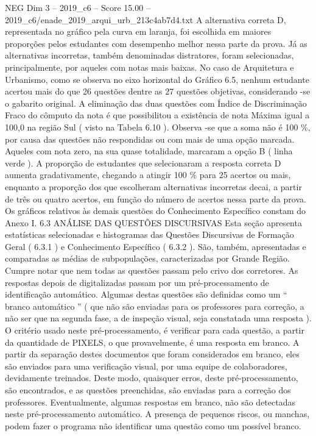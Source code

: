 \begin{textsample}{NEG Dim 3 – 2019\_c6 – Score 15.00 – 2019\_c6/enade\_2019\_arqui\_urb\_213c4ab7d4.txt}
A alternativa correta D, representada no gráfico pela curva em laranja, foi escolhida em maiores proporções pelos estudantes com desempenho melhor nessa parte da prova.
Já as alternativas incorretas, também denominadas distratores, foram selecionadas, principalmente, por aqueles com notas mais baixas.
No caso de Arquitetura e Urbanismo, como se observa no eixo horizontal do Gráfico 6.5, nenhum estudante acertou mais do que 26 questões dentre as 27 questões objetivas, considerando -se o gabarito original.
A eliminação das duas questões com Índice de Discriminação Fraco do cômputo da nota é que possibilitou a existência de nota Máxima igual a 100,0 na região Sul ( visto na Tabela 6.10 ).
Observa -se que a soma não é 100 \%, por causa das questões não respondidas ou com mais de uma opção marcada.
Aqueles com nota zero, na sua quase totalidade, marcaram a opção B ( linha verde ).
A proporção de estudantes que selecionaram a resposta correta D aumenta gradativamente, chegando a atingir 100 \% para 25 acertos ou mais, enquanto a proporção dos que escolheram alternativas incorretas decai, a partir de três ou quatro acertos, em função do número de acertos nessa parte da prova.
Os gráficos relativos às demais questões do Conhecimento Específico constam do Anexo I. 6.3 ANÁLISE DAS QUESTÕES DISCURSIVAS Esta seção apresenta estatísticas selecionadas e histogramas das Questões Discursivas de Formação Geral ( 6.3.1 ) e Conhecimento Específico ( 6.3.2 ).
São, também, apresentadas e comparadas as médias de subpopulações, caracterizadas por Grande Região.
Cumpre notar que nem todas as questões passam pelo crivo dos corretores.
As respostas depois de digitalizadas passam por um pré-processamento de identificação automático.
Algumas destas questões são definidas como um “ branco automático ” ( que não são enviadas para os professores para correção, a não ser que na segunda fase, a de inspeção visual, seja constatada uma resposta ).
O critério usado neste pré-processamento, é verificar para cada questão, a partir da quantidade de PIXELS, o que provavelmente, é uma resposta em branco.
A partir da separação destes documentos que foram considerados em branco, eles são enviados para uma verificação visual, por uma equipe de colaboradores, devidamente treinados.
Deste modo, quaisquer erros, deste pré-processamento, são encontrados, e as questões preenchidas, são enviadas para a correção dos professores.
Eventualmente, algumas respostas em branco, não são detectadas neste pré-processamento automático.
A presença de pequenos riscos, ou manchas, podem fazer o programa não identificar uma questão como um possível branco.

\end{textsample}
